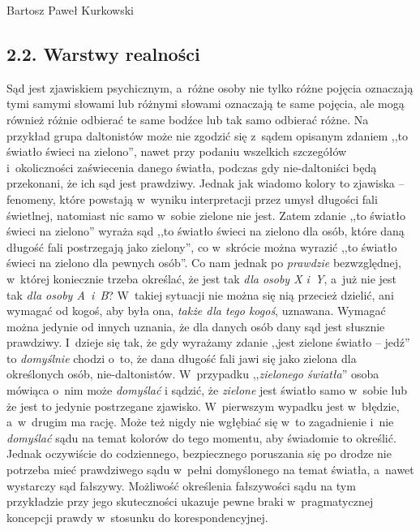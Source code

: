 \begin{artplenv}{Bartosz Paweł Kurkowski}
\subsection{2.2. Warstwy realności}

Sąd jest zjawiskiem psychicznym, a~różne osoby nie tylko różne pojęcia oznaczają tymi samymi słowami lub różnymi słowami
oznaczają te same pojęcia, ale mogą również różnie odbierać te same bodźce lub tak samo odbierać różne. Na przykład
grupa daltonistów może nie zgodzić się z~sądem opisanym zdaniem ,,to światło świeci na zielono'', nawet przy podaniu
wszelkich szczegółów i~okoliczności zaświecenia danego światła, podczas gdy nie-daltoniści będą przekonani, że ich sąd
jest prawdziwy. Jednak jak wiadomo kolory to zjawiska -- fenomeny, które powstają w~wyniku interpretacji przez umysł
długości fali świetlnej, natomiast nic samo w~sobie zielone nie jest. Zatem zdanie ,,to światło świeci na zielono''
wyraża sąd ,,to światło świeci na zielono dla osób, które daną długość fali postrzegają jako zielony'', co w~skrócie
można wyrazić ,,to światło świeci na zielono dla pewnych osób''. Co nam jednak po \textit{prawdzie}
bezwzględnej, w~której koniecznie trzeba określać, że jest
tak \textit{dla osoby X i~Y}, a~już nie jest tak \textit{dla osoby A~i~B}? W~takiej sytuacji nie można się nią
przecież dzielić, ani wymagać od kogoś, aby była ona, \textit{także dla tego kogoś},
uznawana. Wymagać można jedynie od innych uznania, że dla danych osób dany sąd jest słusznie prawdziwy. I~dzieje się
tak, że gdy wyrażamy zdanie ,,jest zielone światło -- jedź'' to \textit{domyślnie }chodzi o~to, że dana długość fali jawi
się jako zielona dla określonych osób, nie-daltonistów. W~przypadku ,,\textit{zielonego światła}'' osoba mówiąca o~nim
może \textit{domyślać }i sądzić, że \textit{zielone} jest światło samo w~sobie lub że jest to jedynie postrzegane
zjawisko. W~pierwszym wypadku jest w~błędzie, a~w~drugim ma rację. Może też nigdy nie wgłębiać się w~to
zagadnienie i~nie \textit{domyślać }sądu na temat kolorów do tego momentu, aby świadomie to określić. Jednak oczywiście do
codziennego, bezpiecznego poruszania się po drodze nie potrzeba mieć prawdziwego sądu w~pełni domyślonego na temat
światła, a~nawet wystarczy sąd fałszywy. Możliwość określenia fałszywości sądu na tym przykładzie przy jego
skuteczności ukazuje pewne braki w~pragmatycznej koncepcji prawdy w~stosunku do  korespondencyjnej.



\end{artplenv}
